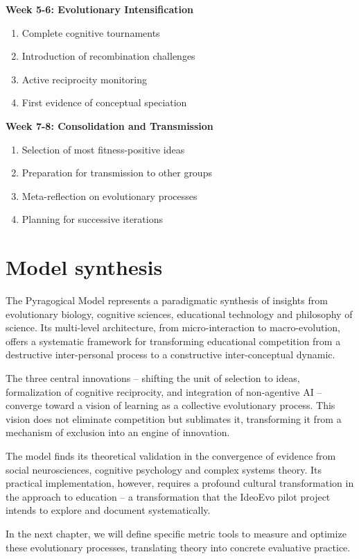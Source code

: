\textbf{Week 5-6: Evolutionary Intensification}
\begin{enumerate}
	\item Complete cognitive tournaments
	\item Introduction of recombination challenges
	\item Active reciprocity monitoring
	\item First evidence of conceptual speciation
\end{enumerate}

\textbf{Week 7-8: Consolidation and Transmission}
\begin{enumerate}
	\item Selection of most fitness-positive ideas
	\item Preparation for transmission to other groups
	\item Meta-reflection on evolutionary processes
	\item Planning for successive iterations
\end{enumerate}

\section{Model synthesis}
The Pyragogical Model represents a paradigmatic synthesis of insights from evolutionary biology, cognitive sciences, educational technology and philosophy of science. Its multi-level architecture, from micro-interaction to macro-evolution, offers a systematic framework for transforming educational competition from a destructive inter-personal process to a constructive inter-conceptual dynamic.

The three central innovations -- shifting the unit of selection to ideas, formalization of cognitive reciprocity, and integration of non-agentive AI -- converge toward a vision of learning as a collective evolutionary process. This vision does not eliminate competition but sublimates it, transforming it from a mechanism of exclusion into an engine of innovation.

The model finds its theoretical validation in the convergence of evidence from social neurosciences, cognitive psychology and complex systems theory. Its practical implementation, however, requires a profound cultural transformation in the approach to education -- a transformation that the IdeoEvo pilot project intends to explore and document systematically.

In the next chapter, we will define specific metric tools to measure and optimize these evolutionary processes, translating theory into concrete evaluative practice.